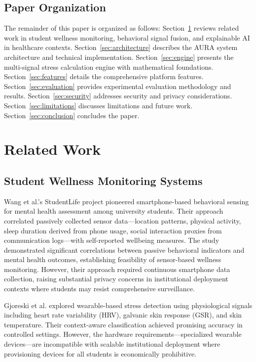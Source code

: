 \documentclass[journal]{IEEEtran}
\begin{document}
\subsection{Paper Organization}

The remainder of this paper is organized as follows: Section~\ref{sec:related} reviews related work in student wellness monitoring, behavioral signal fusion, and explainable AI in healthcare contexts. Section~\ref{sec:architecture} describes the AURA system architecture and technical implementation. Section~\ref{sec:engine} presents the multi-signal stress calculation engine with mathematical foundations. Section~\ref{sec:features} details the comprehensive platform features. Section~\ref{sec:evaluation} provides experimental evaluation methodology and results. Section~\ref{sec:security} addresses security and privacy considerations. Section~\ref{sec:limitations} discusses limitations and future work. Section~\ref{sec:conclusion} concludes the paper.

\section{Related Work}
\label{sec:related}

\subsection{Student Wellness Monitoring Systems}

Wang et al.'s StudentLife project \cite{wang2014} pioneered smartphone-based behavioral sensing for mental health assessment among university students. Their approach correlated passively collected sensor data---location patterns, physical activity, sleep duration derived from phone usage, social interaction proxies from communication logs---with self-reported wellbeing measures. The study demonstrated significant correlations between passive behavioral indicators and mental health outcomes, establishing feasibility of sensor-based wellness monitoring. However, their approach required continuous smartphone data collection, raising substantial privacy concerns in institutional deployment contexts where students may resist comprehensive surveillance.

Gjoreski et al. \cite{gjoreski2017} explored wearable-based stress detection using physiological signals including heart rate variability (HRV), galvanic skin response (GSR), and skin temperature. Their context-aware classification achieved promising accuracy in controlled settings. However, the hardware requirements---specialized wearable devices---are incompatible with scalable institutional deployment where provisioning devices for all students is economically prohibitive.
\end{document}
